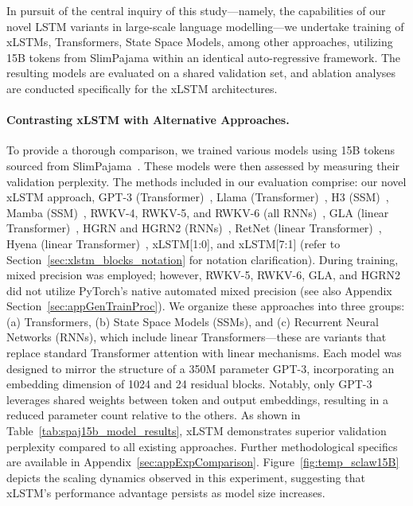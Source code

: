 In pursuit of the central inquiry of this study—namely, the capabilities of our novel LSTM variants in large-scale language modelling—we undertake training of xLSTMs, Transformers, State Space Models, among other approaches, utilizing 15B tokens from SlimPajama within an identical auto-regressive framework. The resulting models are evaluated on a shared validation set, and ablation analyses are conducted specifically for the xLSTM architectures.

\paragraph{Contrasting xLSTM with Alternative Approaches.} To provide a thorough comparison, we trained various models using 15B tokens sourced from SlimPajama~\citep{Soboleva:23}. These models were then assessed by measuring their validation perplexity. The methods included in our evaluation comprise: our novel xLSTM approach, GPT-3 (Transformer)~\citep{Brown:20short}, Llama (Transformer)~\citep{Touvron:23arxiv}, H3 (SSM)~\citep{Fu:23}, Mamba (SSM)~\citep{Gu:24arxiv}, RWKV-4, RWKV-5, and RWKV-6 (all RNNs)~\citep{Peng:23arxivshort, Peng:24arxivshort}, GLA (linear Transformer)~\citep{Yang:23arxiv}, HGRN and HGRN2 (RNNs)~\citep{Qin:23, Qin:24arxiv}, RetNet (linear Transformer)~\citep{Sun:23arxiv}, Hyena (linear Transformer)~\citep{Poli:23}, xLSTM[1:0], and xLSTM[7:1] (refer to Section~\ref{sec:xlstm_blocks_notation} for notation clarification). 
During training, mixed precision was employed; however, RWKV-5, RWKV-6, GLA, and HGRN2 did not utilize PyTorch's native automated mixed precision (see also Appendix Section~\ref{sec:appGenTrainProc}). We organize these approaches into three groups: (a) Transformers, (b) State Space Models (SSMs), and (c) Recurrent Neural Networks (RNNs), which include linear Transformers—these are variants that replace standard Transformer attention with linear mechanisms. Each model was designed to mirror the structure of a 350M parameter GPT-3, 
incorporating an embedding dimension of 1024 and 24 residual blocks. Notably, only GPT-3 leverages shared weights between token and output embeddings, resulting in a reduced parameter count relative to the others. As shown in Table~\ref{tab:spaj15b_model_results}, xLSTM demonstrates superior validation perplexity compared to all existing approaches. Further methodological specifics are available in Appendix~\ref{sec:appExpComparison}. 
Figure~\ref{fig:temp_sclaw15B} depicts the scaling dynamics observed in this experiment, suggesting that xLSTM's performance advantage persists as model size increases.

